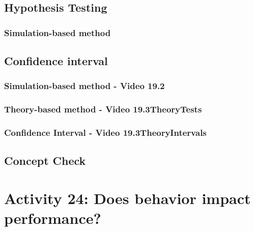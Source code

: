 \documentclass[
]{report}
\begin{document}
\subsection*{Hypothesis Testing}\label{hypothesis-testing-6}

\subsubsection*{Simulation-based method}\label{simulation-based-method-8}

\subsection*{Confidence interval}\label{confidence-interval-6}

\subsubsection*{Simulation-based method - Video 19.2}\label{simulation-based-method---video-19.2}

\subsubsection*{Theory-based method - Video 19.3TheoryTests}\label{theory-based-method---video-19.3theorytests}

\subsubsection*{Confidence Interval - Video 19.3TheoryIntervals}\label{confidence-interval---video-19.3theoryintervals}

\subsection{Concept Check}\label{concept-check-10}

\section{Activity 24: Does behavior impact performance?}\label{activity-24-does-behavior-impact-performance}
\end{document}
